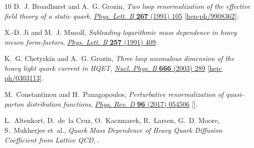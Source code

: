 \begin{thebibliography}{10}
D.~J. Broadhurst and A.~G. Grozin, \emph{{Two loop renormalization of the
  effective field theory of a static quark}},
  \href{https://doi.org/10.1016/0370-2693(91)90532-U}{\emph{Phys. Lett. B}
  {\bfseries 267} (1991) 105}
  [\href{https://arxiv.org/abs/hep-ph/9908362}{{\ttfamily hep-ph/9908362}}].

X.-D. Ji and M.~J. Musolf, \emph{{Subleading logarithmic mass dependence in
  heavy meson form-factors}},
  \href{https://doi.org/10.1016/0370-2693(91)91916-J}{\emph{Phys. Lett. B}
  {\bfseries 257} (1991) 409}.

K.~G. Chetyrkin and A.~G. Grozin, \emph{{Three loop anomalous dimension of the
  heavy light quark current in HQET}},
  \href{https://doi.org/10.1016/S0550-3213(03)00490-5}{\emph{Nucl. Phys. B}
  {\bfseries 666} (2003) 289}
  [\href{https://arxiv.org/abs/hep-ph/0303113}{{\ttfamily hep-ph/0303113}}].

M.~Constantinou and H.~Panagopoulos, \emph{{Perturbative renormalization of
  quasi-parton distribution functions}},
  \href{https://doi.org/10.1103/PhysRevD.96.054506}{\emph{Phys. Rev. D}
  {\bfseries 96} (2017) 054506}
  [\href{https://arxiv.org/abs/1705.11193}{{}}].

L.~Altenkort, D.~de~la Cruz, O.~Kaczmarek, R.~Larsen, G.~D. Moore, S.~Mukherjee
  et~al., \emph{{Quark Mass Dependence of Heavy Quark Diffusion Coefficient
  from Lattice QCD}},  \href{https://arxiv.org/abs/2311.01525}{{}}.

\end{thebibliography}\endgroup
